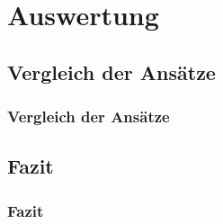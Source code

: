 \documentclass{beamer}
\begin{document}
	\section{Auswertung}
	\subsection{Vergleich der Ansätze}
	\begin{frame}
		\frametitle{Vergleich der Ansätze}
	\end{frame}
	\subsection{Fazit}
	\begin{frame}
		\frametitle{Fazit}
	\end{frame}
\end{document}
